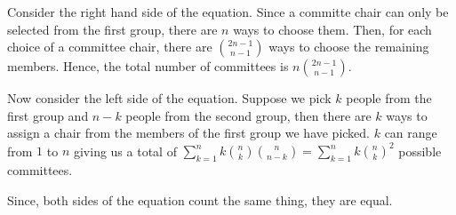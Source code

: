 Consider the right hand side of the equation. Since a committe chair can only 
be selected from the first group, there are $n$ ways to choose them. Then, for 
each choice of a committee chair, there are ${2n-1 \choose n-1}$ ways to choose 
the remaining members. Hence, the total number of committees is $n{2n-1 \choose n-1}$.

Now consider the left side of the equation. Suppose we pick $k$ people from the 
first group and $n-k$ people from the second group, then there are $k$ ways to 
assign a chair from the members of the first group we have picked. $k$ can range 
from $1$ to $n$ giving us a total of 
$\sum_{k=1}^{n} k{n \choose k}{n \choose n-k} = \sum_{k=1}^{n} k{n \choose k}^{2}$ 
possible committees.

Since, both sides of the equation count the same thing, they are equal.
